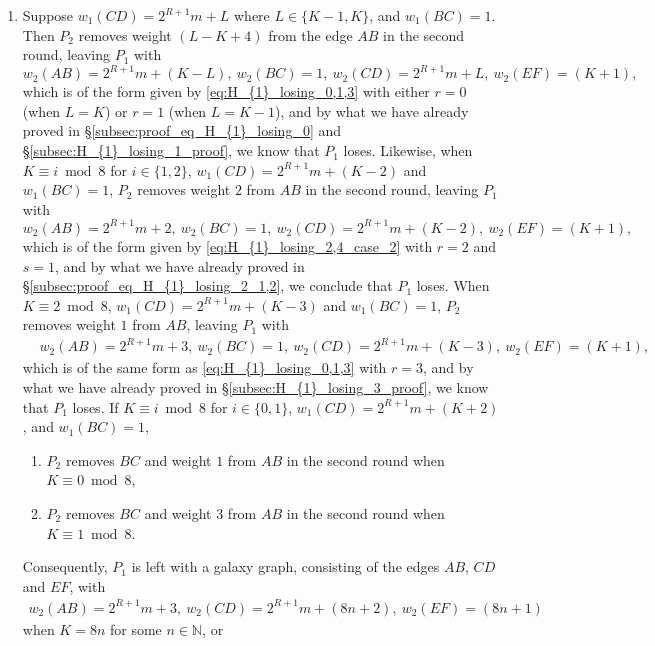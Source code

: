 \documentclass[11pt,reqno]{amsart}
\theoremstyle{definition}
\theoremstyle{definition}
\begin{document}
\begin{enumerate}
\begin{enumerate}
\item Suppose $w_{1}(CD)=2^{R+1}m+L$ where $L \in \{K-1,K\}$, and $w_{1}(BC)=1$. Then $P_{2}$ removes weight $(L-K+4)$ from the edge $AB$ in the second round, leaving $P_{1}$ with
\begin{equation}
w_{2}(AB)=2^{R+1}m+(K-L),\ w_{2}(BC)=1,\ w_{2}(CD)=2^{R+1}m+L,\ w_{2}(EF)=(K+1),\nonumber
\end{equation}
which is of the form given by \eqref{eq:H_{1}_losing_0,1,3} with either $r=0$ (when $L=K$) or $r=1$ (when $L=K-1$), and by what we have already proved in \S\ref{subsec:proof_eq_H_{1}_losing_0} and \S\ref{subsec:H_{1}_losing_1_proof}, we know that $P_{1}$ loses. Likewise, when $K \equiv i \bmod 8$ for $i \in \{1,2\}$, $w_{1}(CD)=2^{R+1}m+(K-2)$ and $w_{1}(BC)=1$, $P_{2}$ removes weight $2$ from $AB$ in the second round, leaving $P_{1}$ with 
\begin{equation}
w_{2}(AB)=2^{R+1}m+2,\ w_{2}(BC)=1,\ w_{2}(CD)=2^{R+1}m+(K-2),\ w_{2}(EF)=(K+1),\nonumber
\end{equation}
which is of the form given by \eqref{eq:H_{1}_losing_2,4_case_2} with $r=2$ and $s=1$, and by what we have already proved in \S\ref{subsec:proof_eq_H_{1}_losing_2_1,2}, we conclude that $P_{1}$ loses. When $K \equiv 2 \bmod 8$, $w_{1}(CD)=2^{R+1}m+(K-3)$ and $w_{1}(BC)=1$, $P_{2}$ removes weight $1$ from $AB$, leaving $P_{1}$ with
\begin{align}
{}&w_{2}(AB)=2^{R+1}m+3,\ w_{2}(BC)=1,\ w_{2}(CD)=2^{R+1}m+(K-3),\ w_{2}(EF)=(K+1),\nonumber
\end{align}
which is of the same form as \eqref{eq:H_{1}_losing_0,1,3} with $r=3$, and by what we have already proved in \S\ref{subsec:H_{1}_losing_3_proof}, we know that $P_{1}$ loses. If $K \equiv i \bmod 8$ for $i \in \{0,1\}$, $w_{1}(CD)=2^{R+1}m+(K+2)$, and $w_{1}(BC)=1$,  
\begin{enumerate}
\item $P_{2}$ removes $BC$ and weight $1$ from $AB$ in the second round when $K \equiv 0 \bmod 8$, 
\item $P_{2}$ removes $BC$ and weight $3$ from $AB$ in the second round when $K \equiv 1 \bmod 8$.
\end{enumerate}
Consequently, $P_{1}$ is left with a galaxy graph, consisting of the edges $AB$, $CD$ and $EF$, with
\begin{align}
w_{2}(AB)=2^{R+1}m+3,\ w_{2}(CD)=2^{R+1}m+(8n+2),\ w_{2}(EF)=(8n+1)\nonumber
\end{align}
when $K=8n$ for some $n \in \mathbb{N}$, or 
\begin{align}

\end{align}
\end{enumerate}
\end{enumerate}
\end{document}
